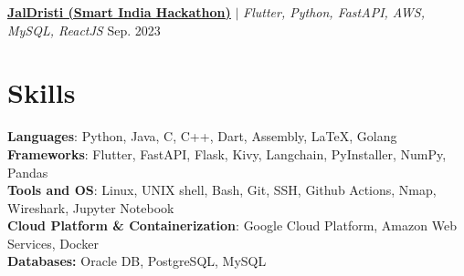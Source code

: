 
\resumeProjectHeading
{\textbf{\href{https://github.com/AM-ash-OR-AM-I/jaldristi}{\underline{JalDristi (Smart India Hackathon)}}} $|$ \emph{ Flutter, Python, FastAPI, AWS, MySQL, ReactJS }} {Sep. 2023 }
\resumeItemListStart
{}
\resumeItemListEnd

\resumeSubHeadingListEnd

%
\vspace{-10px}
\section{Skills}
\begin{itemize}[leftmargin=0.15in, label={}]
  \small{\item{
        \textbf{Languages}{: Python, Java, C, C++, Dart, Assembly, LaTeX, Golang} \\
        \textbf{Frameworks}{: Flutter, FastAPI, Flask, Kivy, Langchain, PyInstaller, NumPy, Pandas} \\
        \textbf{Tools and OS}{: Linux, UNIX shell, Bash, Git, SSH, Github Actions, Nmap, Wireshark, Jupyter Notebook} \\
        \textbf{Cloud Platform \& Containerization}{: Google Cloud Platform, Amazon Web Services, Docker} \\
        \textbf{Databases: }{Oracle DB, PostgreSQL, MySQL} \\
        }}

\end{itemize}


